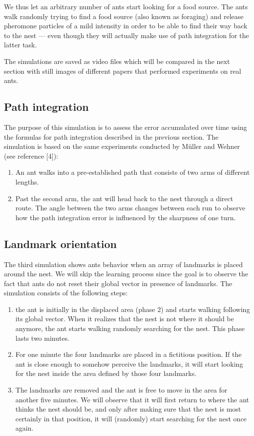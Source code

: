 \documentclass[11pt]{article}
\begin{document}
We thus let an arbitrary number of ants start looking for a food source. The ants walk randomly trying to find a food source (also known as foraging) and release pheromone particles of a mild intensity in order to be able to find their way back to the nest --- even though they will actually make use of path integration for the latter task.

The simulations are saved as video files which will be compared in the next section with still images of different papers that performed experiments on real ants.

\subsection{Path integration}

The purpose of this simulation is to assess the error accumulated over time using the formulas for path integration described in the previous section. The simulation is based on the same experiments conducted by M\"{u}ller and Wehner (see reference [4]):

\begin{enumerate}
\item An ant walks into a pre-established path that consists of two arms of different lengths.
\item Past the second arm, the ant will head back to the nest through a direct route. The angle between the two arms changes between each run to observe how the path integration error is influenced by the sharpness of one turn.
\end{enumerate}

\subsection{Landmark orientation}

The third simulation shows ants behavior when an array of landmarks is placed around the nest. We will skip the learning process since the goal is to observe the fact that ants do not reset their global vector in presence of landmarks. The simulation consists of the following steps:

\begin{enumerate}
\item the ant is initially in the displaced area (phase 2) and starts walking following its global vector. When it realizes that the nest is not where it should be anymore, the ant starts walking randomly searching for the nest. This phase lasts two minutes.
\item For one minute the four landmarks are placed in a fictitious position. If the ant is close enough to somehow perceive the landmarks, it will start looking for the nest inside the area defined by those four landmarks.
\item The landmarks are removed and the ant is free to move in the area for another five minutes. We will observe that it will first return to where the ant thinks the nest should be, and only after making sure that the nest is most certainly in that position, it will (randomly) start searching for the nest once again.
\end{enumerate}
\end{document}
